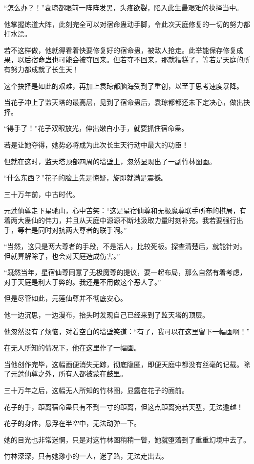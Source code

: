 \begin{this_body}
“怎么办？！”袁琼都眼前一阵阵发黑，头疼欲裂，陷入此生最艰难的抉择当中。

他掌握炼道大阵，此刻完全可以对宿命蛊动手脚，令此次天庭修复的一切的努力都打水漂。

若不这样做，他就得看着快要修复好的宿命蛊，被敌人抢走。此举能保存修复成果，以后宿命蛊也可能会被夺回来。但若夺不回来，那就糟糕了，等若是天庭的所有努力都成就了长生天！

这个抉择是如此的艰难，再加上袁琼都脑海受到了重创，以至于思考速度暴降。

当花子冲上了监天塔的最高层，见到了宿命蛊后，袁琼都都还未下定决心，做出抉择。

“得手了！”花子双眼放光，伸出嫩白小手，就要抓住宿命蛊。

若是让她夺得，她势必将成为此次长生天行动中最大的功臣！

但就在这时，监天塔顶部四周的墙壁上，忽然显现出了一副竹林图画。

“什么东西？”花子的脸上先是惊疑，旋即就满是震撼。

三十万年前，中古时代。

元莲仙尊走下星驰山，心中苦笑：“这是星宿仙尊和无极魔尊联手所布的棋局，有着两大蛊仙的伟力，并且从天庭中源源不断地汲取力量时刻补充。我若要强行出手，等若是同时对抗两大尊者的联手啊。”

“当然，这只是两大尊者的手段，不是活人，比较死板。探查清楚后，就能针对。但就算解除了，也会对天庭造成伤害。”

“既然当年，星宿仙尊同意了无极魔尊的提议，要一起布局，那么自然有着考虑，对于天庭是利大于弊的。我还是不用做这个恶人了。”

但是尽管如此，元莲仙尊并不彻底安心。

他一边沉思，一边漫布，抬头时发现自己已经来到了监天塔的顶层。

他忽然没有了烦恼，对着空白的墙壁笑道：“有了，我可以在这里留下一幅画啊！”

在无人所知的情况下，他在这里作了一幅画。

当他创作完毕，这幅画便消失无踪，彻底隐匿，即便天庭中都没有丝毫的记载。除了元莲仙尊之外，所有人都被蒙在鼓里。

三十万年之后，这幅无人所知的竹林图，显露在花子的面前。

花子的手，距离宿命蛊只有不到一寸的距离，但这点距离宛若天堑，无法逾越！

花子的身体，悬浮在半空中，无法动弹一下。

她的目光也非常迷惘，只是对这竹林图稍稍一瞥，她就堕落到了重重幻境中去了。

竹林深深，只有她渺小的一人，迷了路，无法走出去。


\end{this_body}
